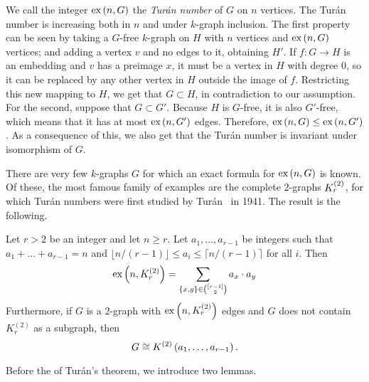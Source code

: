 We call the integer $\text{ex} \left( n, G \right)$ the \emph{Turán number} of $G$ on $n$ vertices.
The Turán number is increasing both in $n$ and under $k$-graph inclusion. %
The first property can be seen by taking a $G$-free $k$-graph on $H$ with $n$ vertices
and $\text{ex} \left( n, G \right)$ vertices; and adding a vertex $v$ and no edges to it, obtaining $H'$.
If $f: G \to H$ is an embedding and $v$ has a preimage $x$, it must be a vertex in $H$ with degree $0$,
so it can be replaced by any other vertex in $H$ outside the image of $f$.
Restricting this new mapping to $H$, we get that $G \subset H$, in contradiction to our assumption.
For the second, suppose that $G \subset G'$.
Because $H$ is $G$-free, it is also $G'$-free, which means that it has at most $\text{ex} \left( n, G' \right)$ edges.
Therefore, $\text{ex} \left( n, G \right) \leq \text{ex} \left( n, G' \right)$.
As a consequence of this, we also get that the Turán number is invariant under isomorphism of $G$.

There are very few $k$-graphs $G$ for which an exact formula for $\text{ex} \left( n, G \right)$ is known.
Of these, the most famous family of examples are the complete $2$-graphs $K^{(2)}_{r}$,
for which Turán numbers were first studied by Turán~\cite{Turan1941} in 1941.
The result is the following.

\begin{theorem}
    \label{thm:turan}
    Let $r > 2$ be an integer and let $n \geq r$.
    Let $a_1, \dots, a_{r-1}$ be integers such that $a_1 + \dots + a_{r-1} = n$
    and $\lfloor n / (r-1) \rfloor \leq a_i \leq \lceil n / (r-1) \rceil$ for all $i$.
    Then
    \begin{equation} \label{eq:turan}
        \text{ex} \left( n, K^{(2)}_{r} \right) = \sum_{\{x, y\} \in \binom{[r-1]}{2}} a_x \cdot a_y
    \end{equation}
    Furthermore, if $G$ is a $2$-graph with $\text{ex} \left( n, K^{(2)}_{r} \right)$ edges
    and $G$ does not contain $K_r^{(2)}$ as a subgraph, then
    \[
        G\cong K^{(2)}\left(a_1, \dots, a_{r-1}\right).
    \]

\end{theorem}

Before the  of Turán's theorem, we introduce two lemmas.

